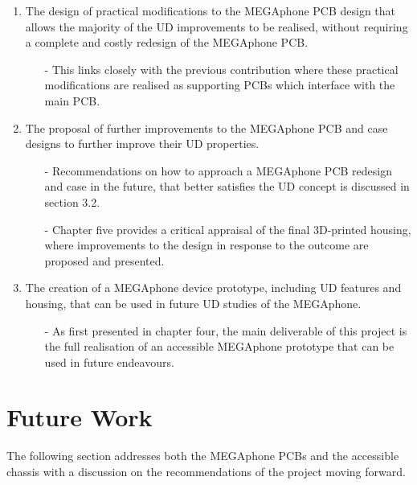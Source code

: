 \begin{enumerate}
\begin{enumerate}
        \end{enumerate} 
    \item The design of practical modifications to the MEGAphone PCB design that allows the majority of the UD improvements to be realised, without requiring a complete and costly redesign of the MEGAphone PCB.
        \begin{enumerate}
        \item[-] This links closely with the previous contribution where these practical modifications are realised as supporting PCBs which interface with the main PCB.
        \end{enumerate} 
    \item The proposal of further improvements to the MEGAphone PCB and case designs to further improve their UD properties.
        \begin{enumerate}
        \item[-] Recommendations on how to approach a MEGAphone PCB redesign and case in the future, that better satisfies the UD concept is discussed in section 3.2.
        \item[-] Chapter five provides a critical appraisal of the final 3D-printed housing, where improvements to the design in response to the outcome are proposed and presented.
        \end{enumerate} 
    \item The creation of a MEGAphone device prototype, including UD features and housing, that can be used in future UD studies of the MEGAphone.
        \begin{enumerate}
        \item[-] As first presented in chapter four, the main deliverable of this project is the full realisation of an accessible MEGAphone prototype that can be used in future endeavours.
        \end{enumerate} 
\end{enumerate}

\section{Future Work}
The following section addresses both the MEGAphone PCBs and the accessible chassis with a discussion on the recommendations of the project moving forward.

